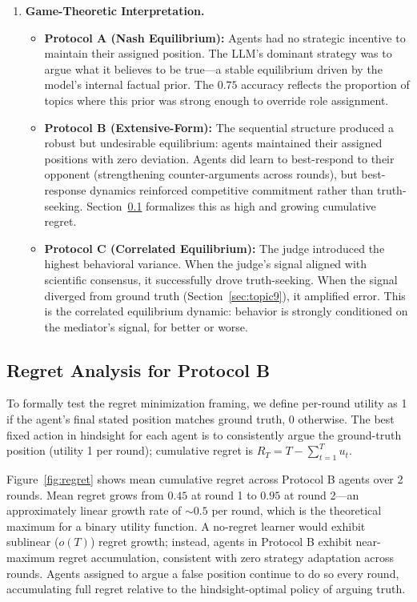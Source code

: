 \documentclass[11pt, oneside]{article}
\begin{document}
\begin{enumerate}
\item \textbf{Game-Theoretic Interpretation.}

\begin{itemize}
\item \textbf{Protocol A (Nash Equilibrium):} Agents had no strategic incentive to maintain their assigned position. The LLM's dominant strategy was to argue what it believes to be true---a stable equilibrium driven by the model's internal factual prior. The $0.75$ accuracy reflects the proportion of topics where this prior was strong enough to override role assignment.

\item \textbf{Protocol B (Extensive-Form):} The sequential structure produced a robust but undesirable equilibrium: agents maintained their assigned positions with zero deviation. Agents did learn to best-respond to their opponent (strengthening counter-arguments across rounds), but best-response dynamics reinforced competitive commitment rather than truth-seeking. Section~\ref{sec:regret} formalizes this as high and growing cumulative regret.

\item \textbf{Protocol C (Correlated Equilibrium):} The judge introduced the highest behavioral variance. When the judge's signal aligned with scientific consensus, it successfully drove truth-seeking. When the signal diverged from ground truth (Section~\ref{sec:topic9}), it amplified error. This is the correlated equilibrium dynamic: behavior is strongly conditioned on the mediator's signal, for better or worse.
\end{itemize}

\end{enumerate}

\subsection{Regret Analysis for Protocol B}
\label{sec:regret}

To formally test the regret minimization framing, we define per-round utility as 1 if the agent's final stated position matches ground truth, 0 otherwise. The best fixed action in hindsight for each agent is to consistently argue the ground-truth position (utility 1 per round); cumulative regret is $R_T = T - \sum_{t=1}^T u_t$.

Figure~\ref{fig:regret} shows mean cumulative regret across Protocol B agents over 2 rounds. Mean regret grows from $0.45$ at round 1 to $0.95$ at round 2---an approximately linear growth rate of $\sim 0.5$ per round, which is the theoretical maximum for a binary utility function. A no-regret learner would exhibit sublinear ($o(T)$) regret growth; instead, agents in Protocol B exhibit near-maximum regret accumulation, consistent with zero strategy adaptation across rounds. Agents assigned to argue a false position continue to do so every round, accumulating full regret relative to the hindsight-optimal policy of arguing truth.
\end{document}

